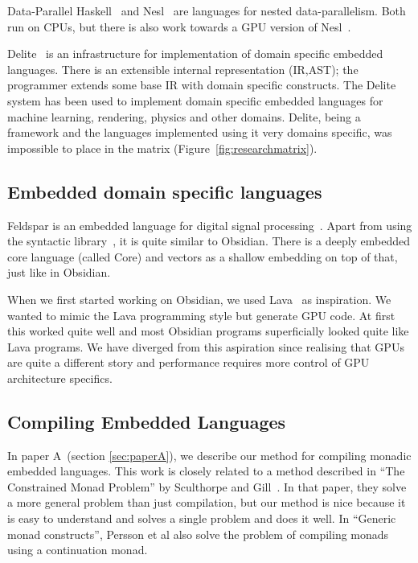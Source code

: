 \documentclass[a4paper]{book}
\begin{document}
Data-Parallel Haskell~\citet{DPH} and Nesl~\citet{NESL} are languages for 
nested data-parallelism. Both run on CPUs, but there is also work towards 
a GPU version of Nesl~\citet{NestedGPU}. 


Delite~\citet{DELITE} is an infrastructure for implementation of domain 
specific embedded languages. There is an extensible internal representation (IR,AST); 
the programmer extends some base IR with domain specific constructs. The Delite system 
has been used to implement domain specific embedded languages for machine learning, rendering, 
physics and other domains. Delite, being a framework and the languages implemented using it 
very domains specific, was impossible to place in the matrix (Figure~\ref{fig:researchmatrix}). 

\subsection{Embedded domain specific languages} 

Feldspar is an embedded language for digital signal processing~\citet{FELDSPAR}. Apart 
from using the syntactic library~\citet{SyntacticICFP12}, it is quite similar to Obsidian. 
There is a deeply embedded core language (called Core) and vectors as a shallow embedding 
on top of that, just like in Obsidian.

When we first started working on Obsidian, we used Lava~\citet{LavaICFP} as inspiration. 
We wanted to mimic the Lava programming style but generate GPU code. At first this worked quite 
well and most Obsidian programs superficially looked quite like Lava programs. We have diverged 
from this aspiration since realising that GPUs are quite a different story and performance 
requires more control of GPU architecture specifics. 

\subsection{Compiling Embedded Languages}

In paper A~(section \ref{sec:paperA}), we describe our method for compiling monadic embedded 
languages. This work is closely related to a method described in ``The Constrained Monad Problem''
by Sculthorpe and Gill~\citet{sculthorpe2013constrained}. In that paper, they solve a more 
general problem than just compilation, but our method is nice because it is easy to understand 
and solves a single problem and does it well. In ``Generic monad constructs'', Persson et al 
also solve the problem of compiling monads using a continuation monad. 
\end{document}
